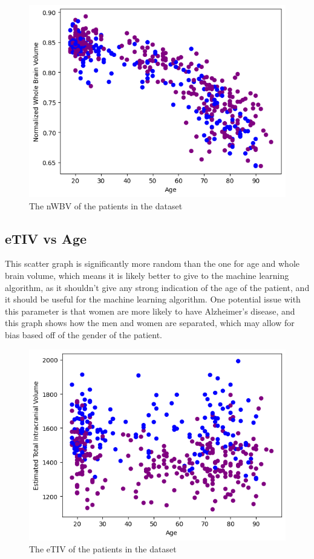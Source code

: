 \documentclass[]{final_report}
\begin{document}
\begin{figure}[h]
  \centering
  \includegraphics[width=1\textwidth]{images/nWBV-vs-Age.png}
  \caption{The nWBV of the patients in the dataset}
  \label{fig:nWBV-vs-Age}
\end{figure}

\clearpage
\subsection{eTIV vs Age}
This scatter graph is significantly more random than the one for age and whole brain volume, which means it is likely better to give to the machine learning algorithm, as it shouldn't give any strong indication of the age of the patient, and it should be useful for the machine learning algorithm.
One potential issue with this parameter is that women are more likely to have Alzheimer's disease, and this graph shows how the men and women are separated, which may allow for bias based off of the gender of the patient.
\begin{figure}[h]
  \centering
  \includegraphics[width=1\textwidth]{images/eTIV-vs-Age.png}
  \caption{The eTIV of the patients in the dataset}
  \label{fig:eTIV-vs-Age}
\end{figure}
\end{document}
